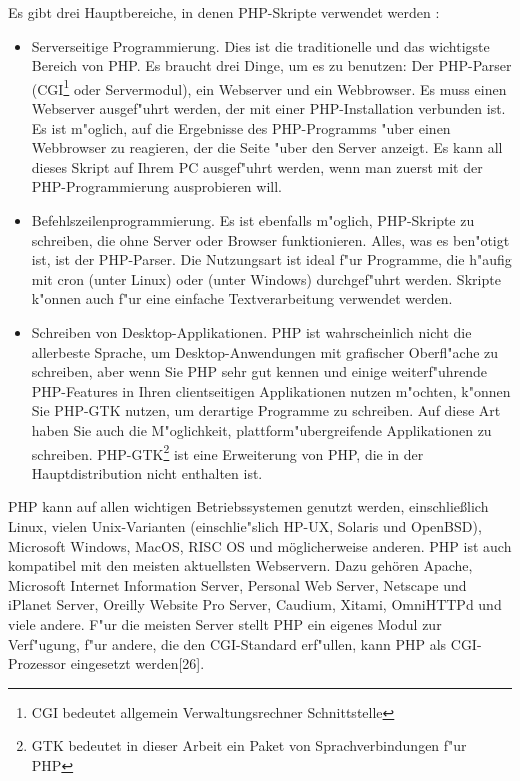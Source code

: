 Es gibt drei Hauptbereiche, in denen PHP-Skripte verwendet werden :
\begin{itemize}
\item Serverseitige Programmierung. 
Dies ist die traditionelle und das wichtigste Bereich 
von PHP. Es braucht drei Dinge,
 um es zu benutzen: 
 Der PHP-Parser (CGI\footnote{CGI bedeutet allgemein Verwaltungsrechner Schnittstelle} oder Servermodul), 
 ein Webserver und ein Webbrowser. Es muss einen Webserver 
 ausgef"uhrt werden, der mit einer PHP-Installation verbunden ist. 
 Es ist m"oglich, auf die Ergebnisse des PHP-Programms 
 "uber einen Webbrowser zu reagieren, 
 der die Seite "uber den Server anzeigt. 
 Es kann all dieses Skript auf Ihrem PC ausgef"uhrt werden, 
 wenn man zuerst mit der PHP-Programmierung ausprobieren will.
 
 
\item Befehlszeilenprogrammierung. 
Es ist ebenfalls m"oglich, PHP-Skripte zu schreiben, 
die ohne Server oder Browser funktionieren. 
Alles, was es ben"otigt ist, ist der PHP-Parser. 
Die Nutzungsart ist ideal f"ur Programme, 
die h"aufig mit cron (unter Linux) oder (unter Windows) 
durchgef"uhrt werden. 
Skripte k"onnen auch f"ur 
eine einfache Textverarbeitung verwendet werden.



\item Schreiben von Desktop-Applikationen. 
PHP ist wahrscheinlich nicht die allerbeste Sprache, 
um Desktop-Anwendungen mit grafischer Oberfl"ache zu schreiben, 
aber wenn Sie PHP sehr gut kennen und einige weiterf"uhrende 
PHP-Features in Ihren clientseitigen Applikationen nutzen m"ochten, 
k"onnen Sie PHP-GTK nutzen, um derartige Programme zu schreiben. 
Auf diese Art haben Sie auch die M"oglichkeit, 
plattform"ubergreifende Applikationen zu schreiben. 
PHP-GTK\footnote{GTK bedeutet in dieser Arbeit ein Paket von Sprachverbindungen f"ur PHP} ist eine Erweiterung von PHP, 
die in der Hauptdistribution nicht enthalten ist.
\end{itemize}

PHP kann auf allen wichtigen Betriebssystemen genutzt werden, 
einschließlich Linux, 
vielen Unix-Varianten (einschlie"slich HP-UX, Solaris und OpenBSD), 
Microsoft Windows, MacOS, RISC OS und möglicherweise anderen. 
PHP ist auch kompatibel mit den meisten aktuellsten Webservern. 
Dazu gehören Apache, Microsoft Internet Information Server, 
Personal Web Server, Netscape und iPlanet Server, 
Oreilly Website Pro Server, Caudium, Xitami, 
OmniHTTPd und viele andere. 
F"ur die meisten Server stellt PHP ein eigenes Modul zur Verf"ugung, 
f"ur andere, die den CGI-Standard erf"ullen, 
kann PHP als CGI-Prozessor eingesetzt werden[26]. 
%
